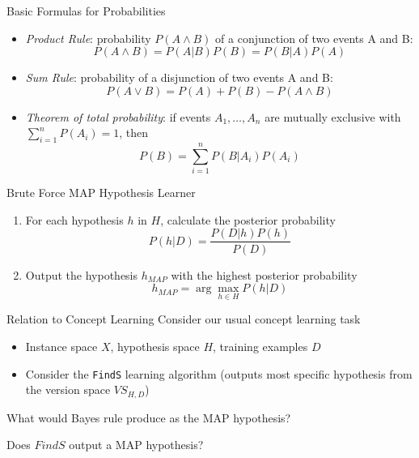 \documentclass[%
pdf,
colorBG,
slideColor,
tcrico,
]{prosper}
\begin{document}
\begin{slide}{ Basic Formulas for Probabilities   }  
\begin{itemize}
\item
\textit{Product Rule}: probability $P(A \wedge B)$ of a conjunction of two events
A and B:
\[P(A \wedge B) = P(A|B) P(B) = P(B|A) P(A) \]

\item
{\em Sum Rule}: probability of a disjunction of two events A and B:
\[P(A \vee B) = P(A) + P(B) - P(A \wedge B) \]

\item
{\em Theorem of total probability}: if events $A_{1}, \ldots, A_{n}$ are mutually exclusive with $\sum_{i = 1}^{n} P(A_{i}) = 1$, then
\[P(B) = \sum_{i = 1}^{n} P(B|A_{i}) P(A_{i})\]
\end{itemize}
\end{slide}


\begin{slide}{ Brute Force MAP Hypothesis Learner   }
\begin{enumerate}
	\item For each hypothesis $h$ in $H$, calculate the posterior probability
	\[ P(h|D) = \frac{P(D|h) P(h)}{P(D)}\]
	\item Output the hypothesis $h_{MAP}$ with the highest posterior probability
	\[h_{MAP} = \arg\max_{h \in H} P(h|D)\]
\end{enumerate}
\end{slide}



\begin{slide}{ Relation to Concept Learning}
Consider our usual concept learning task
\begin{itemize}
	\item Instance space $X$, hypothesis space $H$, training examples $D$
	\item Consider the \texttt{FindS} learning algorithm (outputs most specific hypothesis from the version space $VS_{H,D}$)
\end{itemize}
\bigskip
What would Bayes rule produce as the MAP hypothesis?

\bigskip
Does $FindS$ output a MAP hypothesis?
\end{slide}
\end{document}
